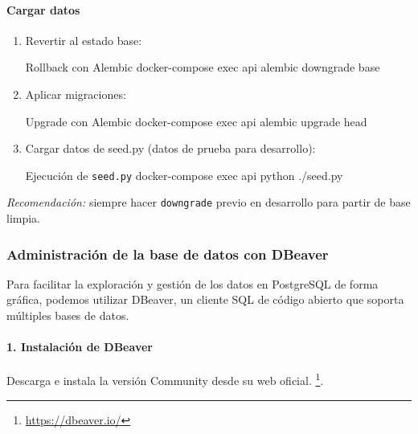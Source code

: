 \documentclass[12pt, a4paper]{article}
\begin{document}
\begin{umaappendices}
	\paragraph{Cargar datos}
	\begin{enumerate}
		\item Revertir al estado base:
		\begin{Terminal}{Rollback con Alembic}
			docker-compose exec api alembic downgrade base
		\end{Terminal}
		\item Aplicar migraciones:
		\begin{Terminal}{Upgrade con Alembic}
			docker-compose exec api alembic upgrade head
		\end{Terminal}
		\item Cargar datos de seed.py (datos de prueba para desarrollo):
		\begin{Terminal}{Ejecución de \texttt{seed.py}}
			docker-compose exec api python ./seed.py
		\end{Terminal}
	\end{enumerate}
	
	\noindent
	\emph{Recomendación:} siempre hacer \texttt{downgrade} previo en desarrollo para partir de base limpia.
	
	\subsubsection{Administración de la base de datos con DBeaver}

	
	Para facilitar la exploración y gestión de los datos en PostgreSQL de forma gráfica, podemos utilizar DBeaver, un cliente SQL de código abierto que soporta múltiples bases de datos.
	
	\paragraph{1. Instalación de DBeaver}  
	Descarga e instala la versión Community desde su web oficial. \footnote{\url{https://dbeaver.io/}}.  
	

\end{umaappendices}
\end{document}
